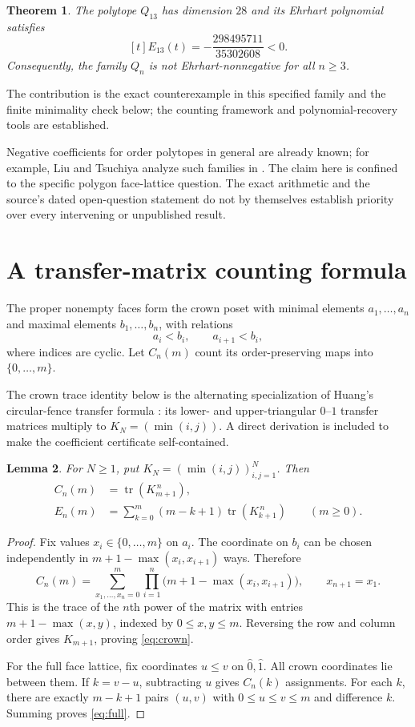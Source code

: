 \documentclass[11pt,letterpaper]{article}
\newtheorem{theorem}{Theorem}
\newtheorem{lemma}[theorem]{Lemma}
\newcommand{\tr}{\operatorname{tr}}
\begin{document}
\begin{theorem}\label{thm:negative}
The polytope $Q_{13}$ has dimension $28$ and its Ehrhart polynomial satisfies
\begin{equation}\label{eq:answer}
 \boxed{[t]E_{13}(t)=-\frac{298495711}{35302608}<0.}
\end{equation}
Consequently, the family $Q_n$ is not Ehrhart-nonnegative for all $n\geq3$.
\end{theorem}

The contribution is the exact counterexample in this specified family and the finite minimality check below; the counting framework and polynomial-recovery tools are established.

Negative coefficients for order polytopes in general are already known; for example, Liu and Tsuchiya analyze such families in \cite{LT}. The claim here is confined to the specific polygon face-lattice question. The exact arithmetic and the source's dated open-question statement do not by themselves establish priority over every intervening or unpublished result.

\section{A transfer-matrix counting formula}
The proper nonempty faces form the crown poset with minimal elements $a_1,\ldots,a_n$ and maximal elements $b_1,\ldots,b_n$, with relations
\[
 a_i<b_i,\qquad a_{i+1}<b_i,
\]
where indices are cyclic. Let $C_n(m)$ count its order-preserving maps into $\{0,\ldots,m\}$.

The crown trace identity below is the alternating specialization of Huang's circular-fence transfer formula \cite[Proposition~4.1]{Huang}: its lower- and upper-triangular $0$--$1$ transfer matrices multiply to $K_N=(\min(i,j))$. A direct derivation is included to make the coefficient certificate self-contained.

\begin{lemma}\label{lem:count}
For $N\geq1$, put $K_N=(\min(i,j))_{i,j=1}^N$. Then
\begin{align}
 C_n(m)&=\tr(K_{m+1}^{\,n}),\label{eq:crown}\\
 E_n(m)&=\sum_{k=0}^m(m-k+1)\tr(K_{k+1}^{\,n})\qquad(m\geq0).\label{eq:full}
\end{align}
\end{lemma}
\begin{proof}
Fix values $x_i\in\{0,\ldots,m\}$ on $a_i$. The coordinate on $b_i$ can be chosen independently in $m+1-\max(x_i,x_{i+1})$ ways. Therefore
\[
 C_n(m)=\sum_{x_1,\ldots,x_n=0}^m
 \prod_{i=1}^n\bigl(m+1-\max(x_i,x_{i+1})\bigr),\qquad x_{n+1}=x_1.
\]
This is the trace of the $n$th power of the matrix with entries $m+1-\max(x,y)$, indexed by $0\leq x,y\leq m$. Reversing the row and column order gives $K_{m+1}$, proving \eqref{eq:crown}.

For the full face lattice, fix coordinates $u\leq v$ on $\hat0,\hat1$. All crown coordinates lie between them. If $k=v-u$, subtracting $u$ gives $C_n(k)$ assignments. For each $k$, there are exactly $m-k+1$ pairs $(u,v)$ with $0\leq u\leq v\leq m$ and difference $k$. Summing proves \eqref{eq:full}.
\end{proof}
\end{document}
